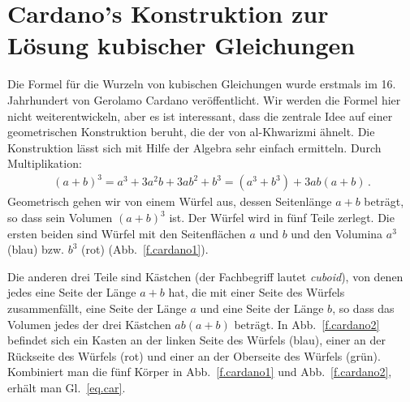\section{Cardano's Konstruktion zur Lösung kubischer Gleichungen}\label{s.cardano}

Die Formel für die Wurzeln von kubischen Gleichungen wurde erstmals im 16. Jahrhundert von Gerolamo Cardano veröffentlicht. Wir werden die Formel hier nicht weiterentwickeln, aber es ist interessant, dass die zentrale Idee auf einer geometrischen Konstruktion beruht, die der von al-Khwarizmi ähnelt. Die Konstruktion lässt sich mit Hilfe der Algebra sehr einfach ermitteln. Durch Multiplikation:
\begin{align}\label{eq.car}
(a+b)^3=a^3+3a^2b+3ab^2+b^3=(a^3+b^3)+3ab(a+b)\,.
\end{align}
Geometrisch gehen wir von einem Würfel aus, dessen Seitenlänge $a+b$ beträgt, so dass sein Volumen $(a+b)^3$ ist. Der Würfel wird in fünf Teile zerlegt. Die ersten beiden sind Würfel mit den Seitenflächen $a$ und $b$ und den Volumina $a^3$ (blau) bzw. $b^3$ (rot) (Abb.~\ref{f.cardano1}).

Die anderen drei Teile sind Kästchen (der Fachbegriff lautet \emph{cuboid}), von denen jedes eine Seite der Länge $a+b$ hat, die mit einer Seite des Würfels zusammenfällt, eine Seite der Länge $a$ und eine Seite der Länge $b$, so dass das Volumen jedes der drei Kästchen $ab(a+b)$ beträgt. In Abb.~\ref{f.cardano2} befindet sich ein Kasten an der linken Seite des Würfels (blau), einer an der Rückseite des Würfels (rot) und einer an der Oberseite des Würfels (grün).
Kombiniert man die fünf Körper in Abb.~\ref{f.cardano1} und Abb.~\ref{f.cardano2}, erhält man Gl.~\ref{eq.car}.


